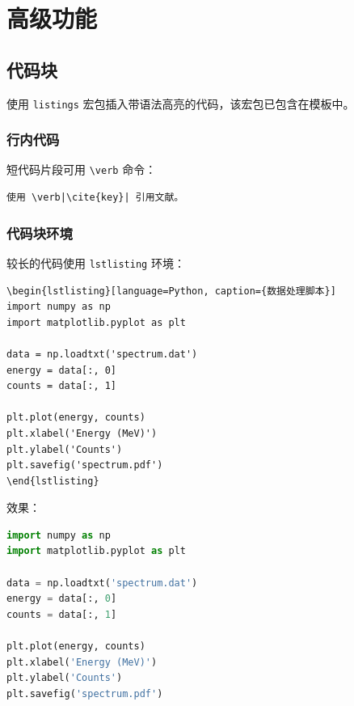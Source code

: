 

\chapter{高级功能}\label{chap:advanced}

\section{代码块}

使用 \texttt{listings} 宏包插入带语法高亮的代码，该宏包已包含在模板中。

\subsection{行内代码}

短代码片段可用 \verb|\verb| 命令：
\begin{verbatim}
使用 \verb|\cite{key}| 引用文献。
\end{verbatim}

\subsection{代码块环境}

较长的代码使用 \texttt{lstlisting} 环境：

\begin{verbatim}
\begin{lstlisting}[language=Python, caption={数据处理脚本}]
import numpy as np
import matplotlib.pyplot as plt

data = np.loadtxt('spectrum.dat')
energy = data[:, 0]
counts = data[:, 1]

plt.plot(energy, counts)
plt.xlabel('Energy (MeV)')
plt.ylabel('Counts')
plt.savefig('spectrum.pdf')
\end{lstlisting}
\end{verbatim}

效果：

\begin{lstlisting}[language=Python, caption={能谱数据处理脚本示例}]
import numpy as np
import matplotlib.pyplot as plt

data = np.loadtxt('spectrum.dat')
energy = data[:, 0]
counts = data[:, 1]

plt.plot(energy, counts)
plt.xlabel('Energy (MeV)')
plt.ylabel('Counts')
plt.savefig('spectrum.pdf')
\end{lstlisting}

